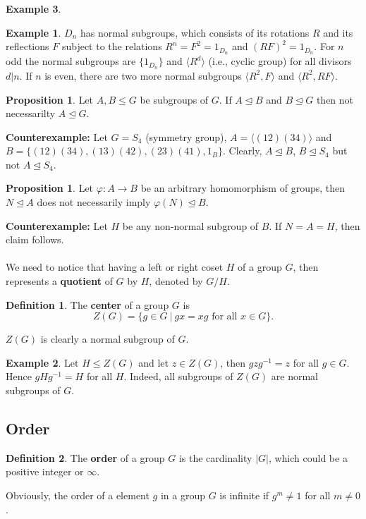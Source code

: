 \documentclass[11pt]{amsbook}%
\theoremstyle{plain}
\theoremstyle{definition}
\newtheorem{definition*}{Definition}
\newtheorem*{example*}{Example}
\newtheorem{proposition}[theorem]{Proposition}
\numberwithin{equation}{section}
\newcommand{\leftnormal}{\trianglelefteq}
\begin{document}
\begin{example*}
\begin{example*}
  $D_{n}$ has normal subgroups, which consists of its rotations $R$ and
  its reflections $F$ subject to the relations $R^{n} = F^{2} = 1_{D_{n}}$
  and $(RF)^{2} = 1_{D_{n}}$. For $n$ odd the normal subgroups are
  $\{1_{D_{n}}\}$ and $\langle R^{d} \rangle$ (i.e., cyclic group) for all divisors
  $d \vert n$. If $n$ is even, there are two more normal subgroups
  $\langle R^{2}, F \rangle$ and $\langle R^{2}, RF \rangle$.
\end{example*}

\begin{proposition}
  Let $A, B \leq G$ be subgroups of $G$. If $A \leftnormal B$ and
  $B \leftnormal G$ then not necessarilty $A \leftnormal G$.
\end{proposition} \vspace{1.8em}
\textbf{Counterexample: }Let $G = S_{4}$ (symmetry group), $A = \langle (12)(34) \rangle$
and $B = \{(12)(34), (13)(42), (23)(41), 1_{B}\}$. Clearly, $A \leftnormal B$,
$B \leftnormal S_{4}$ but not $A \leftnormal S_{4}$. \qedsymbol

\begin{proposition}
  Let $\varphi: A \longrightarrow B$ be an arbitrary homomorphism of groups, then
  $N \leftnormal A$ does not necessarily imply $\varphi(N) \leftnormal B$.
\end{proposition} \vspace{1.8em}
\textbf{Counterexample: } Let $H$ be any non-normal subgroup of $B$.
If $N = A = H$, then claim follows. \\ \\
We need to notice that having a left or right coset $H$ of a group $G$, then 
represents a \textbf{quotient} of $G$ by $H$, denoted by $G/H$.

\begin{definition*}
  \label{def-center}
  The \textbf{center} of a group $G$ is
  $$
  Z(G) = \{g \in G \ \vert \ gx = xg \text{ for all } x \in G \}.
  $$
\end{definition*}
$Z(G)$ is clearly a normal subgroup of $G$.

\begin{example*}
  Let $H \leq Z(G)$ and let $z \in Z(G)$, then $gzg^{-1} = z$ for all
  $g \in G$. Hence $gHg^{-1} = H$ for all $H$. Indeed, all
  subgroups of $Z(G)$ are normal subgroups of $G$.
\end{example*}

\subsection{Order}
\begin{definition*}
  The \textbf{order} of a group $G$ is the cardinality $|G|$, which could be
  a positive integer or $\infty$.
\end{definition*}
Obviously, the order of a element $g$ in a group $G$ is infinite
if $g^{m} \neq 1$ for all $m \neq 0$. \\


\end{example*}
\end{document}
